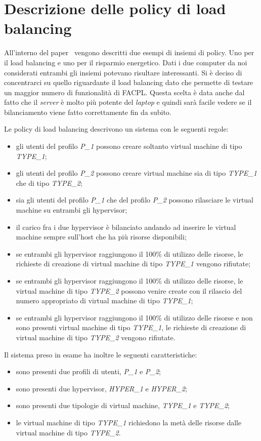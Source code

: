 \section{Descrizione delle policy di load balancing}
All'interno del paper~\cite{10.1007/978-3-319-08260-8_6} vengono descritti due esempi di insiemi di policy. Uno per il load balancing e uno per il risparmio energetico. Dati i due computer da noi considerati entrambi gli insiemi potevano risultare interessanti. Si è deciso di concentrarci su quello riguardante il load balancing dato che permette di testare un maggior numero di funzionalità di FACPL. Questa scelta è data anche dal fatto che il \emph{server} è molto più potente del \emph{laptop} e quindi sarà facile vedere se il bilanciamento viene fatto correttamente fin da subito.\par
Le policy di load balancing descrivono un sistema con le seguenti regole:
\begin{itemize}
    \item gli utenti del profilo \emph{P\_1} possono creare soltanto virtual machine di tipo \emph{TYPE\_1};
    \item gli utenti del profilo \emph{P\_2} possono creare virtual machine sia di tipo \emph{TYPE\_1} che di tipo \emph{TYPE\_2};
    \item sia gli utenti del profilo \emph{P\_1} che del profilo \emph{P\_2} possono rilasciare le virtual machine su entrambi gli hypervisor;
    \item il carico fra i due hypervisor è bilanciato andando ad inserire le virtual machine sempre sull'host che ha più risorse disponibili;
    \item se entrambi gli hypervisor raggiungono il 100\% di utilizzo delle risorse, le richieste di creazione di virtual machine di tipo \emph{TYPE\_1} vengono rifiutate;
    \item se entrambi gli hypervisor raggiungono il 100\% di utilizzo delle risorse, le virtual machine di tipo \emph{TYPE\_2} possono venire create con il rilascio del numero appropriato di virtual machine di tipo \emph{TYPE\_1};
    \item se entrambi gli hypervisor raggiungono il 100\% di utilizzo delle risorse e non sono presenti virtual machine di tipo \emph{TYPE\_1}, le richieste di creazione di virtual machine di tipo \emph{TYPE\_2} vengono rifiutate.
\end{itemize}
Il sistema preso in esame ha inoltre le seguenti caratteristiche:
\begin{itemize}
    \item sono presenti due profili di utenti, \emph{P\_1} e \emph{P\_2};
    \item sono presenti due hypervisor, \emph{HYPER\_1} e \emph{HYPER\_2};
    \item sono presenti due tipologie di virtual machine, \emph{TYPE\_1} e \emph{TYPE\_2};
    \item le virtual machine di tipo \emph{TYPE\_1} richiedono la metà delle risorse dalle virtual machine di tipo \emph{TYPE\_2}.
\end{itemize}

